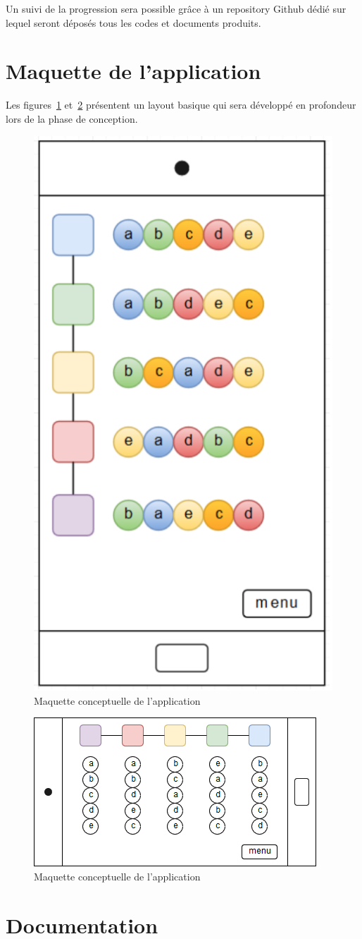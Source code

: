 \documentclass[a4paper, 11pt, titlepage, oneside]{report}
\begin{document}
Un suivi de la progression sera possible grâce à un repository Github dédié sur lequel seront déposés tous les codes et documents produits.

	\section{Maquette de l'application}
	
	Les figures~\ref{fig:mockup1} et~\ref{fig:mockup2} présentent un layout basique qui sera développé en profondeur lors de la phase de conception.

	\begin{figure}[h!]
		\centering
		\includegraphics[width=0.3\linewidth]{maquette.png}
		\caption{Maquette conceptuelle de l'application}
		\label{fig:mockup1}
	\end{figure}
	
	\begin{figure}[h!]
		\centering
		\includegraphics[width=0.7\linewidth]{maquette2.png}
		\caption{Maquette conceptuelle de l'application}
		\label{fig:mockup2}
	\end{figure}
	
	\section{Documentation}
	
\end{document}

